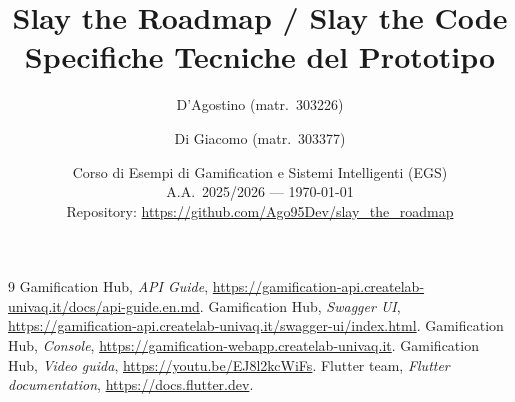 \documentclass[a4paper,11pt]{report}
\title{Slay the Roadmap / Slay the Code\\Specifiche Tecniche del Prototipo}
\author{D'Agostino (matr.\ 303226) \and Di Giacomo (matr.\ 303377)}
\date{Corso di Esempi di Gamification e Sistemi Intelligenti (EGS)\\A.A.\ 2025/2026 --- \today\\[1ex]
\small Repository: \url{https://github.com/Ago95Dev/slay_the_roadmap}}
\begin{document}
\maketitle
\tableofcontents










\begin{thebibliography}{9}
 Gamification Hub, \textit{API Guide}, \url{https://gamification-api.createlab-univaq.it/docs/api-guide.en.md}.
 Gamification Hub, \textit{Swagger UI}, \url{https://gamification-api.createlab-univaq.it/swagger-ui/index.html}.
 Gamification Hub, \textit{Console}, \url{https://gamification-webapp.createlab-univaq.it}.
 Gamification Hub, \textit{Video guida}, \url{https://youtu.be/EJ8l2kcWiFs}.
 Flutter team, \textit{Flutter documentation}, \url{https://docs.flutter.dev}.
\end{thebibliography}
\end{document}
